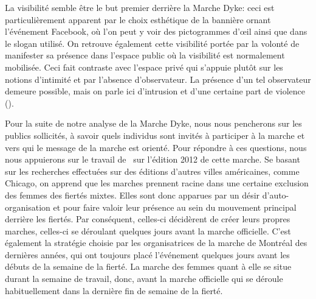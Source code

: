 La visibilité semble être le but premier derrière la Marche Dyke: ceci est particulièrement apparent par le choix esthétique de la bannière ornant l'événement Facebook, où l'on peut y voir des pictogrammes d'œil ainsi que dans le slogan utilisé.
On retrouve également cette visibilité portée par la volonté de manifester sa présence dans l'espace public où la visibilité est normalement mobilisée.
Ceci fait contraste avec l'espace privé qui s'appuie plutôt sur les notions d'intimité et par l'absence d'observateur.
La présence d'un tel observateur demeure possible, mais on parle  ici d'intrusion et d'une certaine part de violence ().

Pour la suite de notre analyse de la Marche Dyke, nous nous pencherons sur les publics sollicités, à savoir quels individus sont invités à participer à la marche et vers qui le message de la marche est orienté.
Pour répondre à ces questions, nous nous appuierons sur le travail de~\cite{Podmore2015a} sur l'édition 2012 de cette marche.
Se basant sur les recherches effectuées sur des éditions d'autres villes américaines, comme Chicago, on apprend que les marches \dykes{} prennent racine dans une certaine exclusion des femmes des fiertés mixtes.
Elles sont donc apparues par un désir d'auto-organisation et pour faire valoir leur présence au sein du mouvement principal derrière les fiertés.
Par conséquent, celles-ci décidèrent de créer leurs propres marches, celles-ci se déroulant quelques jours avant la marche officielle.
C'est également la stratégie choisie par les organisatrices de la marche de Montréal des dernières années, qui ont toujours placé l'événement quelques jours avant les débuts de la semaine de la fierté.
La marche des femmes quant à elle se situe durant la semaine de travail, donc, avant la marche officielle qui se déroule habituellement dans la dernière fin de semaine de la fierté.

